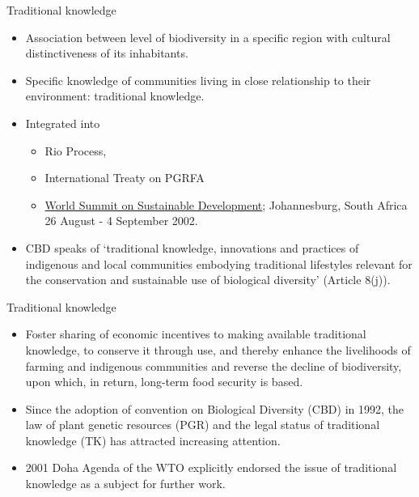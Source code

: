 \documentclass[
  ignorenonframetext,
  aspectratio=169]{beamer}
\providecommand{\tightlist}{%
  \setlength{\itemsep}{0pt}\setlength{\parskip}{0pt}}
\begin{document}
\begin{frame}{Traditional knowledge}
\protect\hypertarget{traditional-knowledge}{}
\begin{itemize}
\tightlist
\item
  Association between level of biodiversity in a specific region with
  cultural distinctiveness of its inhabitants.
\item
  Specific knowledge of communities living in close relationship to
  their environment: traditional knowledge.
\item
  Integrated into

  \begin{itemize}
  \tightlist
  \item
    Rio Process,
  \item
    International Treaty on PGRFA
  \item
    \href{https://sustainabledevelopment.un.org/milesstones/wssd}{World
    Summit on Sustainable Development}; Johannesburg, South Africa 26
    August - 4 September 2002.
  \end{itemize}
\item
  CBD speaks of `traditional knowledge, innovations and practices of
  indigenous and local communities embodying traditional lifestyles
  relevant for the conservation and sustainable use of biological
  diversity' (Article 8(j)).
\end{itemize}
\end{frame}

\begin{frame}{Traditional knowledge}
\protect\hypertarget{traditional-knowledge-1}{}
\begin{itemize}
\tightlist
\item
  Foster sharing of economic incentives to making available traditional
  knowledge, to conserve it through use, and thereby enhance the
  livelihoods of farming and indigenous communities and reverse the
  decline of biodiversity, upon which, in return, long-term food
  security is based. \citep{biber2006rights}
\item
  Since the adoption of convention on Biological Diversity (CBD) in
  1992, the law of plant genetic resources (PGR) and the legal status of
  traditional knowledge (TK) has attracted increasing attention.
\item
  2001 Doha Agenda of the WTO explicitly endorsed the issue of
  traditional knowledge as a subject for further work.
\end{itemize}
\end{frame}
\end{document}
